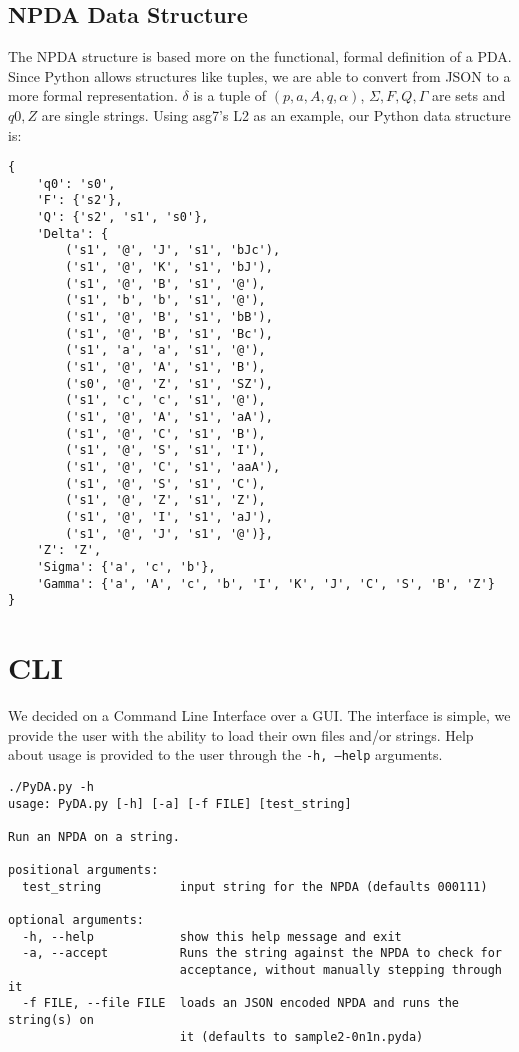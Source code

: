 \documentclass[a4paper]{article}
\begin{document}
\subsection{NPDA Data Structure}
The NPDA structure is based more on the functional, formal definition of a PDA.
Since Python allows structures like tuples, we are able to convert from JSON to
a more formal representation. $\delta$ is a tuple of $(p,a,A,q,\alpha)$,
$\Sigma, F, Q, \Gamma$ are sets and $q0, Z$ are single strings. Using asg7's L2
as an example, our Python data structure is:
\begin{verbatim}
{
    'q0': 's0',
    'F': {'s2'},
    'Q': {'s2', 's1', 's0'},
    'Delta': {
        ('s1', '@', 'J', 's1', 'bJc'),
        ('s1', '@', 'K', 's1', 'bJ'),
        ('s1', '@', 'B', 's1', '@'),
        ('s1', 'b', 'b', 's1', '@'),
        ('s1', '@', 'B', 's1', 'bB'),
        ('s1', '@', 'B', 's1', 'Bc'),
        ('s1', 'a', 'a', 's1', '@'),
        ('s1', '@', 'A', 's1', 'B'),
        ('s0', '@', 'Z', 's1', 'SZ'),
        ('s1', 'c', 'c', 's1', '@'),
        ('s1', '@', 'A', 's1', 'aA'),
        ('s1', '@', 'C', 's1', 'B'),
        ('s1', '@', 'S', 's1', 'I'),
        ('s1', '@', 'C', 's1', 'aaA'),
        ('s1', '@', 'S', 's1', 'C'),
        ('s1', '@', 'Z', 's1', 'Z'),
        ('s1', '@', 'I', 's1', 'aJ'),
        ('s1', '@', 'J', 's1', '@')},
    'Z': 'Z',
    'Sigma': {'a', 'c', 'b'},
    'Gamma': {'a', 'A', 'c', 'b', 'I', 'K', 'J', 'C', 'S', 'B', 'Z'}
}
\end{verbatim}
\section{CLI}
We decided on a Command Line Interface over a GUI. The interface is simple, we
provide the user with the ability to load their own files and/or strings. Help
about usage is provided to the user through the \texttt{-h, --help} arguments.
\begin{verbatim}
./PyDA.py -h
usage: PyDA.py [-h] [-a] [-f FILE] [test_string]

Run an NPDA on a string.

positional arguments:
  test_string           input string for the NPDA (defaults 000111)

optional arguments:
  -h, --help            show this help message and exit
  -a, --accept          Runs the string against the NPDA to check for
                        acceptance, without manually stepping through it
  -f FILE, --file FILE  loads an JSON encoded NPDA and runs the string(s) on
                        it (defaults to sample2-0n1n.pyda)
\end{verbatim}
\end{document}
